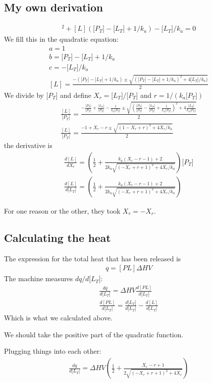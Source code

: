 \documentclass[11pt, fleqn]{report}
\newcommand{\lc}{[L]}
\newcommand{\plc}{[PL]}
\newcommand{\ka}{k_a}
\newcommand{\pcz}{\lbrack P_T\rbrack}
\newcommand{\lcz}{\lbrack L_T\rbrack}
\newcommand{\xr}{X_r}
\begin{document}
\subsection*{My own derivation}
\begin{eqnarray}
\lc^2 + \lc ( \pcz - \lcz + 1/\ka) - \lcz/\ka = 0 
\end{eqnarray}
We fill this in the quadratic equation:
\begin{eqnarray}
a=1\\
b=\pcz - \lcz + 1/\ka\\
c=-\lcz/\ka\\
\lc=\frac{-\left( \pcz-\lcz+1/\ka \right)\pm \sqrt{(\pcz-\lcz+1/\ka)^2+4\lcz/\ka)}}{2}
\end{eqnarray}
We divide by $\pcz$ and define $\xr=\lcz/\pcz$ and $r=1/(\ka\pcz)$
\begin{eqnarray}
\frac{\lc}{\pcz} = \frac{ -\frac{\pcz}{\pcz} + \frac{\lcz}{\pcz} - \frac{1}{\ka\pcz} \pm  \sqrt{\left( \frac{\pcz}{\pcz}-\frac{\lcz}{\pcz}+\frac{1}{\ka\pcz} \right)^2+4\frac{\lcz}{\ka\pcz}}}{2}\\
\frac{\lc}{\pcz} = \frac{-1 + \xr -r \pm \sqrt{(1 - \xr + r)^2+4\xr/\ka}}{2}
\end{eqnarray}
the derivative is
\begin{eqnarray}
\frac{d\lc}{d\xr} = \left( \frac{1}{2} + \frac{\ka(\xr-r-1)+2}{ 2\ka\sqrt{(-\xr+r+1)^2 + 4\xr/\ka} } \right) \pcz\\
\frac{d\lc}{d\lcz} = \left( \frac{1}{2} + \frac{\ka(\xr-r-1)+2}{ 2\ka\sqrt{(-\xr+r+1)^2 + 4\xr/\ka} } \right)
\end{eqnarray}

For one reason or the other, they took $X_r=-X_r$. 


\subsection*{Calculating the heat}

The expression for the total heat that has been released is
\begin{eqnarray}
q=\plc \Delta H V
\end{eqnarray}
The machine measures $d q /d \lcz$:
\begin{eqnarray}
\frac{d q}{d\lcz} = \Delta H V \frac{d\plc}{d\lcz} \\
\frac{d\plc}{d\lcz} = \frac{d\lcz}{d\lcz} - \frac{d\lc}{d\lcz} 
\end{eqnarray}
Which is what we calculated above.

We should take the positive part of the quadratic function.

Plugging things into each other:
\begin{eqnarray}
\frac{d q}{d\lcz} = \Delta H V \left( \frac{1}{2} + \frac{\xr-r+1}{ 2\sqrt{(-\xr+r+1)^2 + 4\xr} } \right)
\end{eqnarray}
\end{document}
